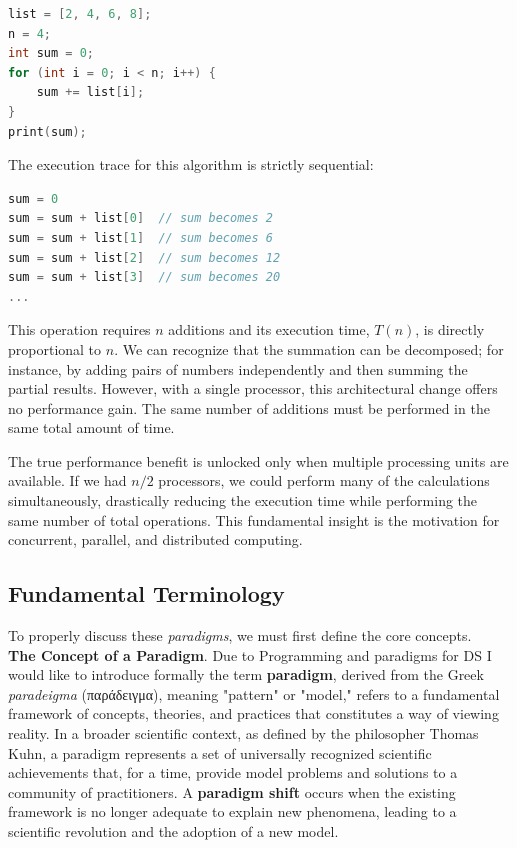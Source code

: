 \begin{lstlisting}[language=C, label={lst:seq_sum}]
list = [2, 4, 6, 8];
n = 4;
int sum = 0;
for (int i = 0; i < n; i++) {
    sum += list[i];
}
print(sum);
\end{lstlisting}

The execution trace for this algorithm is strictly sequential:
\begin{lstlisting}[language=C, label={lst:seq_sum2}]
sum = 0
sum = sum + list[0]  // sum becomes 2
sum = sum + list[1]  // sum becomes 6
sum = sum + list[2]  // sum becomes 12
sum = sum + list[3]  // sum becomes 20
...
\end{lstlisting}
This operation requires $n$ additions and its execution time, $T(n)$, is directly proportional to $n$. We can recognize that the summation can be decomposed; for instance, by adding pairs of numbers independently and then summing the partial results. However, with a single processor, this architectural change offers no performance gain. The same number of additions must be performed in the same total amount of time.

The true performance benefit is unlocked only when multiple processing units are available. If we had $n/2$ processors, we could perform many of the calculations simultaneously, drastically reducing the execution time while performing the same number of total operations. This fundamental insight is the motivation for concurrent, parallel, and distributed computing.

\subsection{Fundamental Terminology}
To properly discuss these \textit{paradigms}, we must first define the core concepts.\\

\hline
\textbf{The Concept of a Paradigm}. Due to Programming and paradigms for DS I would like to introduce formally the term \textbf{paradigm}, derived from the Greek \textit{paradeigma} (\foreignlanguage{greek}{παράδειγμα}), meaning "pattern" or "model," refers to a fundamental framework of concepts, theories, and practices that constitutes a way of viewing reality. In a broader scientific context, as defined by the philosopher Thomas Kuhn, a paradigm represents a set of universally recognized scientific achievements that, for a time, provide model problems and solutions to a community of practitioners. A \textbf{paradigm shift} occurs when the existing framework is no longer adequate to explain new phenomena, leading to a scientific revolution and the adoption of a new model.

